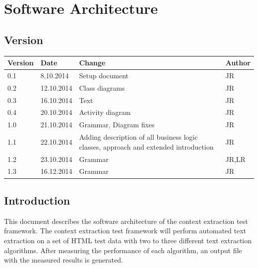 
\chapter{Software Architecture} %

\label{architecture} %



\section{Version}

\begin{tabular}{| p{1.5cm} | p{2cm} | p{9cm} | p{1.5cm} |}
	\hline
	Version & Date 		& Change & Author \\ \hline
	0.1 	& 8.10.2014 		& Setup document  										& JR \\ \hline
	0.2 	& 12.10.2014		& Class diagrams										& JR \\ \hline
	0.3 	& 16.10.2014		& Text													& JR \\ \hline
	0.4 	& 20.10.2014		& Activity diagram										& JR \\ \hline
	1.0 	& 21.10.2014		& Grammar, Diagram fixes								& JR \\ \hline
	1.1 	& 22.10.2014		& Adding description of all business logic classes, approach and extended introduction & JR \\ \hline
	1.2 	& 23.10.2014		& Grammar & JR,LR \\ \hline
	1.3 	& 16.12.2014		& Grammar & JR \\ \hline

\end{tabular}

\section{Introduction} 

This document describes the software architecture of the context extraction test framework. 
The context extraction test framework will perform automated text extraction on a set of HTML test data with two to three different text extraction algorithms. After measuring the performance of each algorithm, an output file with the measured results is generated.

